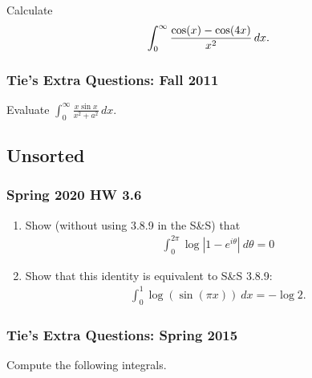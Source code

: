 \begin{problem}[?]

Calculate
\begin{align*}
\int_0^\infty {\cos(x) - \cos(4x) \over x^2} \, dx
.\end{align*}

\end{problem}

\hypertarget{ties-extra-questions-fall-2011}{%
\subsubsection{Tie's Extra Questions: Fall
2011}\label{ties-extra-questions-fall-2011}}

Evaluate
\(\displaystyle{ \int_{0}^{\infty}\frac{x\sin x}{x^2+a^2} \,dx}\).

\hypertarget{unsorted}{%
\subsection{Unsorted}\label{unsorted}}

\hypertarget{spring-2020-hw-3.6}{%
\subsubsection{Spring 2020 HW 3.6}\label{spring-2020-hw-3.6}}

\begin{enumerate}
\def\labelenumi{\alph{enumi}.}
\item
  Show (without using 3.8.9 in the S\&S) that
  \begin{align*}
  \int_0^{2\pi} \log{\left\lvert {1 - e^{i\theta}} \right\rvert}~d\theta = 0
  \end{align*}
\item
  Show that this identity is equivalent to S\&S 3.8.9:
  \begin{align*}
  \int_0^1 \log(\sin(\pi x)) ~dx = -\log 2
  .\end{align*}
\end{enumerate}

\hypertarget{ties-extra-questions-spring-2015-2}{%
\subsubsection{Tie's Extra Questions: Spring
2015}\label{ties-extra-questions-spring-2015-2}}

Compute the following integrals.

